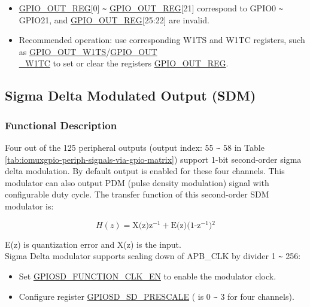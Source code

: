 \documentclass[main\_\_EN.tex]{subfiles}
\begin{document}
\begin{tiplisting}
\vspace{-2em}
\begin{itemize} 
\item \hyperref[regdesc:GPIOOUTREG]{GPIO\_OUT\_REG}[0] \verb+~+ \hyperref[regdesc:GPIOOUTREG]{GPIO\_OUT\_REG}[21] correspond to GPIO0 \verb+~+ GPIO21, and \hyperref[regdesc:GPIOOUTREG]{GPIO\_OUT\_REG}[25:22] are invalid.
\item Recommended operation: use corresponding W1TS and W1TC registers, such as \hyperref[fielddesc:GPIOOUTW1TS]{GPIO\_OUT\_W1TS}/\hyperref[fielddesc:GPIOOUTW1TC]{GPIO\_OUT\\\_W1TC} to set or clear the registers \hyperref[regdesc:GPIOOUTREG]{GPIO\_OUT\_REG}.
\end{itemize}
\end{tiplisting}

\subsection{Sigma Delta Modulated Output (SDM)}

\subsubsection{Functional Description}

Four out of the 125 peripheral outputs (output index: 55 \verb+~+ 58 in Table \ref{tab:iomuxgpio-periph-signals-via-gpio-matrix}) support 1-bit second-order sigma delta modulation. By default output is enabled for these four channels. This modulator can also output PDM (pulse density modulation) signal with configurable duty cycle. The transfer function of this second-order SDM modulator is:

\[
    H(z)=\textrm{X(z)z$^{-1}$} + \textrm{E(z)(1-z$^{-1}$)$^{2}$}
    \]

E(z) is quantization error and X(z) is the input.\\
Sigma Delta modulator supports scaling down of APB\_CLK by divider 1 \verb+~+ 256: 
\begin{itemize}
    \item Set \hyperref[fielddesc:GPIOSDFUNCTIONCLKEN]{GPIOSD\_FUNCTION\_CLK\_EN} to enable the modulator clock.
    \item Configure register \hyperref[fielddesc:GPIOSDSDNPRESCALE]{GPIOSD\_SD\_PRESCALE} ( is 0 \verb+~+ 3 for four channels).
\end{itemize}
\end{document}
